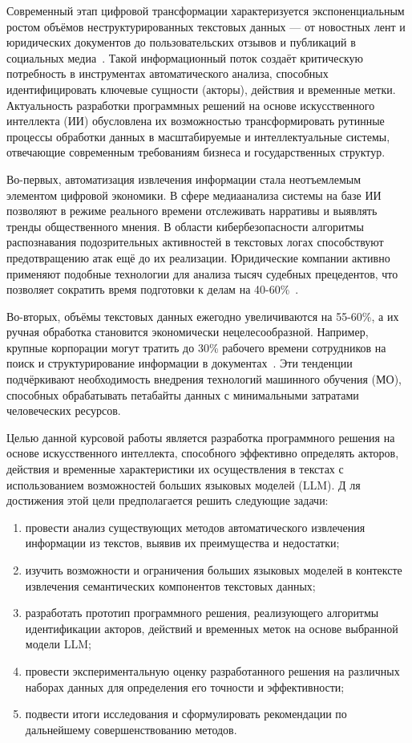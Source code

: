 
Современный этап цифровой трансформации характеризуется экспоненциальным ростом объёмов неструктурированных текстовых данных — 
от новостных лент и юридических документов до пользовательских отзывов и публикаций в социальных медиа \cite{intro:1}. 
Такой информационный поток создаёт критическую потребность в инструментах автоматического анализа, 
способных идентифицировать ключевые сущности (акторы), действия и временные метки. 
Актуальность разработки программных решений на основе искусственного интеллекта (ИИ) обусловлена 
их возможностью трансформировать рутинные процессы обработки данных в масштабируемые и интеллектуальные системы, 
отвечающие современным требованиям бизнеса и государственных структур.

Во-первых, автоматизация извлечения информации стала неотъемлемым элементом цифровой экономики. 
В сфере медиаанализа системы на базе ИИ позволяют в режиме реального времени отслеживать нарративы и выявлять тренды общественного мнения. 
В области кибербезопасности алгоритмы распознавания подозрительных активностей в текстовых логах способствуют предотвращению атак ещё до их реализации. 
Юридические компании активно применяют подобные технологии для анализа тысяч судебных прецедентов, что позволяет сократить время подготовки к делам на 40-60\% \cite{intro:2}.

Во-вторых, объёмы текстовых данных ежегодно увеличиваются на 55-60\%, а их ручная обработка становится экономически нецелесообразной. 
Например, крупные корпорации могут тратить до 30\% рабочего времени сотрудников на поиск и структурирование информации в документах \cite{intro:3}.
Эти тенденции подчёркивают необходимость внедрения технологий машинного обучения (МО), способных обрабатывать петабайты данных с минимальными затратами человеческих ресурсов.

Целью данной курсовой работы является разработка программного решения на основе искусственного интеллекта, 
способного эффективно определять акторов, действия и временные характеристики их осуществления в текстах с использованием возможностей больших языковых моделей (LLM). Д
ля достижения этой цели предполагается решить следующие задачи:
\begin{enumerate}
    \item провести анализ существующих методов автоматического извлечения информации из текстов, выявив их преимущества и недостатки;
    \item изучить возможности и ограничения больших языковых моделей в контексте извлечения семантических компонентов текстовых данных;
    \item разработать прототип программного решения, реализующего алгоритмы идентификации акторов, действий и временных меток на основе выбранной модели LLM;
    \item провести экспериментальную оценку разработанного решения на различных наборах данных для определения его точности и эффективности;
    \item подвести итоги исследования и сформулировать рекомендации по дальнейшему совершенствованию методов.
\end{enumerate}

\clearpage
